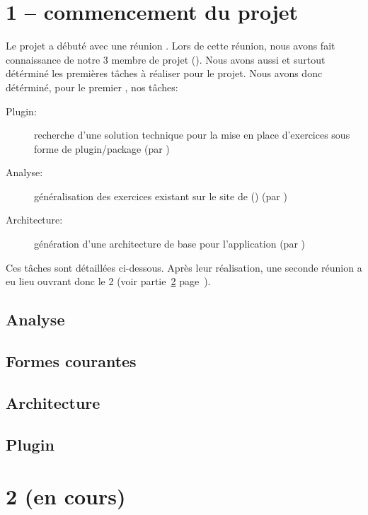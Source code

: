 \documentclass[french]{report}
\begin{document}
\section{1\ier{} \sprint{} -- commencement du projet}
\label{sprint1}
Le projet a débuté avec une réunion%
. Lors de cette réunion, nous avons fait connaissance de notre 3\ieme{} membre de projet (\etudiantSL{}). Nous avons aussi et surtout détérminé les premières t\^{a}ches à réaliser pour le projet.
Nous avons donc détérminé, pour le premier \sprint{}, nos t\^aches:
\begin{description}
	\item[Plugin:] recherche d'une solution technique pour la mise en place d'exercices sous forme de plugin/package (par \etudiantSL{})
	\item[Analyse:] \og{}généralisation\fg{} des exercices existant sur le site de \pepit{} (\pepitSite{}) (par \etudiantRD{})
	\item[Architecture:] génération d'une architecture de base pour l'application (par \etudiantJP{})
\end{description}
Ces tâches sont détaillées ci-dessous. Après leur réalisation, une seconde réunion a eu lieu ouvrant donc le 2\ieme{} \sprint{} (voir partie~\ref{sprint2} page~\pageref{sprint2}).
\subsection{Analyse}
\label{partie_analyse}

\subsection{Formes courantes}
\label{partie_formes_courantes}

\subsection{Architecture}
\label{partie_architecture}

\subsection{Plugin}
\label{partie_plugin}

\section{2\ieme{} \sprint{} (en cours)}
\label{sprint2}
\end{document}
